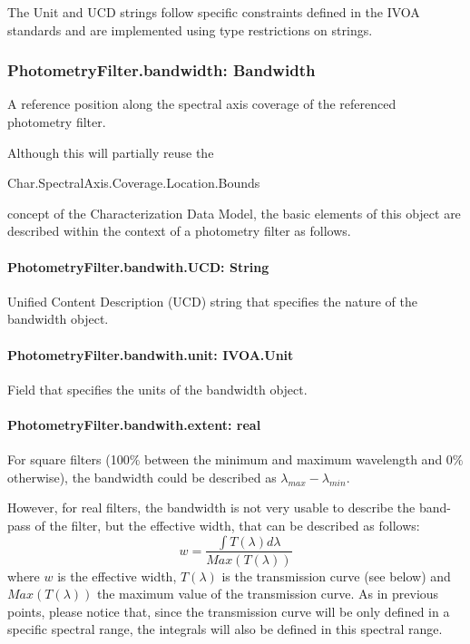 \documentclass[11pt,a4paper]{ivoa}
\begin{document}
The Unit and UCD strings follow specific constraints defined in the IVOA standards and are 
implemented using type restrictions on strings.
\par

\subsubsection{PhotometryFilter.bandwidth: Bandwidth}
A reference position along the spectral axis coverage of the referenced photometry filter.
\par

Although this will partially reuse the
\par

\begin{center}
Char.SpectralAxis.Coverage.Location.Bounds
\end{center}\par

\noindent concept of the Characterization Data Model, 
the basic elements of this object are described 
within the context of a photometry filter as follows.
\par

\paragraph{PhotometryFilter.bandwith.UCD: String}
Unified Content Description (UCD) string that specifies the nature of the bandwidth object.
\par

\paragraph{PhotometryFilter.bandwith.unit: IVOA.Unit}
Field that specifies the units of the bandwidth object.
\par

\paragraph{PhotometryFilter.bandwith.extent: real}
For square filters (100$\%$  between the minimum and maximum wavelength and 0$\%$  otherwise), 
the bandwidth could be described as $\lambda_{max} - \lambda_{min}$.
\par

However, for real filters, the bandwidth is not very usable to describe the band-pass of the 
filter, but the effective width, that can be described as follows:
\begin{equation} \label{eq:21}
w = \frac{\int T(\lambda)d\lambda}{Max(T(\lambda))}
\end{equation}
where $w$ is the effective width, $T(\lambda)$ is the transmission curve (see below) 
and $Max(T(\lambda))$ the maximum value of the transmission curve. As in previous points, 
please notice that, since the transmission curve will be only defined in a specific spectral 
range, the integrals will also be defined in this spectral range.
\par
\end{document}
